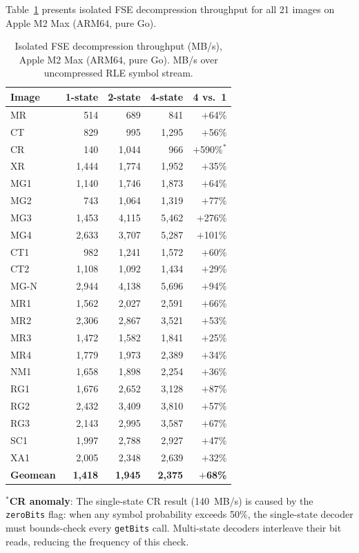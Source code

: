 \documentclass[journal]{IEEEtran}
\begin{document}
Table~\ref{tab:fse-arm64} presents isolated FSE decompression throughput for
all 21 images on Apple M2 Max (ARM64, pure Go).

\begin{table}[htbp]
\centering
\caption{Isolated FSE decompression throughput (MB/s), Apple M2 Max (ARM64,
pure Go). MB/s over uncompressed RLE symbol stream.}
\label{tab:fse-arm64}
\scriptsize
\begin{tabular}{lrrrr}
\toprule
Image & 1-state & 2-state & 4-state & 4 vs.\ 1 \\
\midrule
MR   &   514 &   689 &   841 & $+$64\% \\
CT   &   829 &   995 & 1,295 & $+$56\% \\
CR   &   140 & 1,044 &   966 & $+$590\%$^*$ \\
XR   & 1,444 & 1,774 & 1,952 & $+$35\% \\
MG1  & 1,140 & 1,746 & 1,873 & $+$64\% \\
MG2  &   743 & 1,064 & 1,319 & $+$77\% \\
MG3  & 1,453 & 4,115 & 5,462 & $+$276\% \\
MG4  & 2,633 & 3,707 & 5,287 & $+$101\% \\
CT1  &   982 & 1,241 & 1,572 & $+$60\% \\
CT2  & 1,108 & 1,092 & 1,434 & $+$29\% \\
MG-N & 2,944 & 4,138 & 5,696 & $+$94\% \\
MR1  & 1,562 & 2,027 & 2,591 & $+$66\% \\
MR2  & 2,306 & 2,867 & 3,521 & $+$53\% \\
MR3  & 1,472 & 1,582 & 1,841 & $+$25\% \\
MR4  & 1,779 & 1,973 & 2,389 & $+$34\% \\
NM1  & 1,658 & 1,898 & 2,254 & $+$36\% \\
RG1  & 1,676 & 2,652 & 3,128 & $+$87\% \\
RG2  & 2,432 & 3,409 & 3,810 & $+$57\% \\
RG3  & 2,143 & 2,995 & 3,587 & $+$67\% \\
SC1  & 1,997 & 2,788 & 2,927 & $+$47\% \\
XA1  & 2,005 & 2,348 & 2,639 & $+$32\% \\
\midrule
\textbf{Geomean} & \textbf{1,418} & \textbf{1,945} & \textbf{2,375} & \textbf{$+$68\%} \\
\bottomrule
\end{tabular}
\end{table}

$^*$\textbf{CR anomaly}: The single-state CR result (140~MB/s) is caused by the
\texttt{zeroBits} flag: when any symbol probability exceeds 50\%, the
single-state decoder must bounds-check every \texttt{getBits} call. Multi-state
decoders interleave their bit reads, reducing the frequency of this check.
\end{document}
